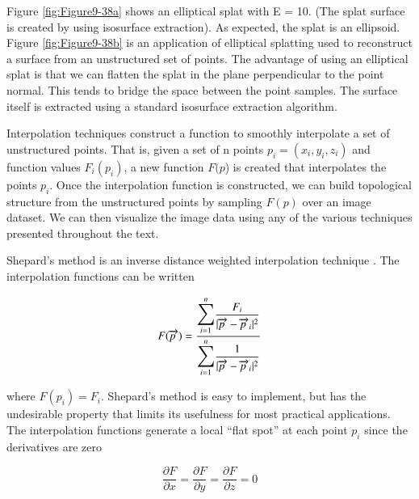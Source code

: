 \begin{description}[leftmargin=0cm,labelindent=0cm]
Figure \ref{fig:Figure9-38a} shows an elliptical splat with E = 10. (The splat surface is created by using isosurface extraction). As expected, the splat is an ellipsoid. Figure \ref{fig:Figure9-38b} is an application of elliptical splatting used to reconstruct a surface from an unstructured set of points. The advantage of using an elliptical splat is that we can flatten the splat in the plane perpendicular to the point normal. This tends to bridge the space between the point samples. The surface itself is extracted using a standard isosurface extraction algorithm.

\item[Interpolation Techniques.] Interpolation techniques construct a function to smoothly interpolate a set of unstructured points. That is, given a set of n points $p_i = (x_i, y_i, z_i)$ and function values $F_i(p_i)$, a new function $F(p$) is created that interpolates the points $p_i$. Once the interpolation function is constructed, we can build topological structure from the unstructured points by sampling $F(p)$ over an image dataset. We can then visualize the image data using any of the various techniques presented throughout the text. 

Shepard's method is an inverse distance weighted interpolation technique \cite{Wixom78}. The interpolation functions can be written

\begin{equation}\label{eq:9.25}
F(\overrightarrow{p\ }) = \dfrac{\mathlarger{\mathlarger{\sum}}_{i=1}^n \dfrac{F_i}{\vert\overrightarrow{p\ } - \overrightarrow{p\ }_i\vert^2}}{\mathlarger{\mathlarger{\sum}}_{i=1}^n \dfrac{1}{\vert\overrightarrow{p\ } - \overrightarrow{p\ }_i \vert^2}}
\end{equation}

\noindent where $F(p_i) = F_i$. Shepard's method is easy to implement, but has the undesirable property that limits its usefulness for most practical applications. The interpolation functions generate a local ``flat spot'' at each point $p_i$ since the derivatives are zero

\begin{equation}\label{eq:9.26}
\dfrac{\partial F}{\partial x} =
\dfrac{\partial F}{\partial y} =
\dfrac{\partial F}{\partial z} = 0
\end{equation}


\end{description}
